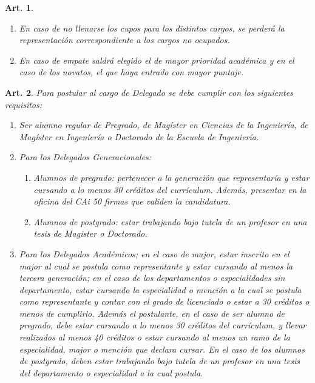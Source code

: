 \documentclass[letterpaper,11pt]{article}
\theoremstyle{plain}
\newtheorem{art}{Art.} %
\begin{document}
\begin{art}
\begin{enumerate}
\begin{enumerate}
						\\
						Tratándose del Representante de College será elegida la primera mayoría.
						\item En caso de no llenarse los cupos para los distintos cargos, se perderá la representación correspondiente a los cargos no ocupados.
						\item En caso de empate saldrá elegido el de mayor prioridad académica y en el caso de los novatos, el que haya entrado con mayor puntaje.
					\end{enumerate}
			\end{enumerate}
		\end{art}

		\begin{art}\label{requisitosDelegados}
			Para postular al cargo de Delegado se debe cumplir con los siguientes requisitos:
			\begin{enumerate}
				\item Ser alumno regular de Pregrado, de Magíster en Ciencias de la Ingeniería, de Magíster en Ingeniería o Doctorado de la Escuela de Ingeniería.
				\item Para los Delegados Generacionales:
					\begin{enumerate}
						\item Alumnos de pregrado: pertenecer a la generación que representaría y estar cursando a lo menos 30 créditos del currículum. Además, presentar en la oficina del CAi 50 firmas que validen la candidatura.
						\item Alumnos de postgrado: estar trabajando bajo tutela de un profesor en una tesis de Magister o Doctorado.
					\end{enumerate}
				\item Para los Delegados Académicos; en el caso de major, estar inscrito en el major al cual se postula como representante y estar cursando al menos la tercera generación; en el caso de los departamentos o especialidades sin departamento, estar cursando la especialidad o mención a la cual se postula como representante y contar con el grado de licenciado o estar a 30 créditos o menos de cumplirlo. Además el postulante, en el caso de ser alumno de pregrado, debe estar cursando a lo menos 30 créditos del currículum, y llevar realizados al menos 40 créditos o estar cursando al menos un ramo de la especialidad, major o mención que declara cursar. En el caso de los alumnos de postgrado, deben estar trabajando bajo tutela de un profesor en una tesis del departamento o especialidad a la cual postula.
			\end{enumerate}
		\end{art}
\end{document}
